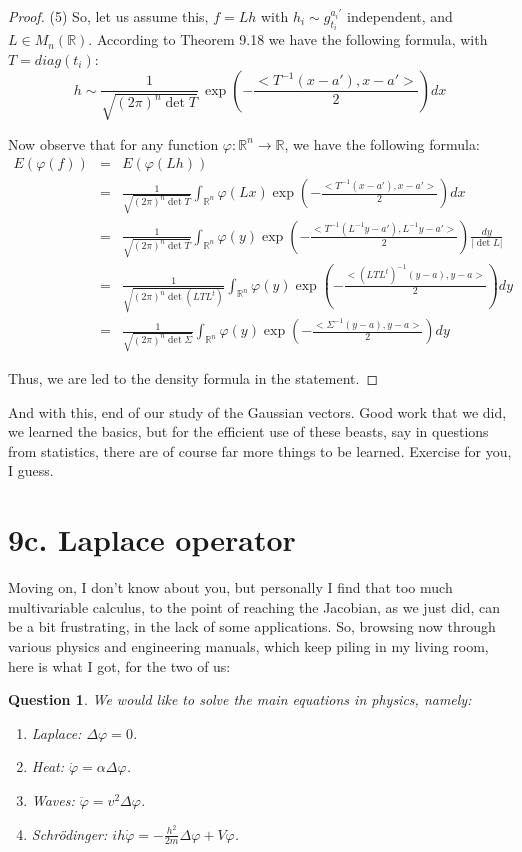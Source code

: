 \documentclass[12pt]{amsbook}
\newtheorem{question}[theorem]{Question}
\begin{document}
\begin{proof}
\medskip

(5) So, let us assume this, $f=Lh$ with $h_i\sim g_{t_i}^{a_i'}$ independent, and $L\in M_n(\mathbb R)$. According to Theorem 9.18 we have the following formula, with $T=diag(t_i)$:
$$h\sim\frac{1}{\sqrt{(2\pi)^n\det T}}\,\exp\left(-\frac{<T^{-1}(x-a'),x-a'>}{2}\right)dx$$

Now observe that for any function $\varphi:\mathbb R^n\to\mathbb R$, we have the following formula:
\begin{eqnarray*}
E(\varphi(f))
&=&E(\varphi(Lh))\\
&=&\frac{1}{\sqrt{(2\pi)^n\det T}}\int_{\mathbb R^n}\varphi(Lx)\exp\left(-\frac{<T^{-1}(x-a'),x-a'>}{2}\right)dx\\
&=&\frac{1}{\sqrt{(2\pi)^n\det T}}\int_{\mathbb R^n}\varphi(y)\exp\left(-\frac{<T^{-1}(L^{-1}y-a'),L^{-1}y-a'>}{2}\right)\frac{dy}{|\det L|}\\
&=&\frac{1}{\sqrt{(2\pi)^n\det(LTL^t)}}\int_{\mathbb R^n}\varphi(y)\exp\left(-\frac{<(LTL^t)^{-1}(y-a),y-a>}{2}\right)dy\\
&=&\frac{1}{\sqrt{(2\pi)^n\det\Sigma}}\int_{\mathbb R^n}\varphi(y)\exp\left(-\frac{<\Sigma^{-1}(y-a),y-a>}{2}\right)dy
\end{eqnarray*}

Thus, we are led to the density formula in the statement.
\end{proof}

And with this, end of our study of the Gaussian vectors. Good work that we did, we learned the basics, but for the efficient use of these beasts, say in questions from statistics, there are of course far more things to be learned. Exercise for you, I guess.

\section*{9c. Laplace operator}

Moving on, I don't know about you, but personally I find that too much multivariable calculus, to the point of reaching the Jacobian, as we just did, can be a bit frustrating, in the lack of some applications. So, browsing now through various physics and engineering manuals, which keep piling in my living room, here is what I got, for the two of us:

\begin{question}
We would like to solve the main equations in physics, namely:
\begin{enumerate}
\item Laplace: $\Delta\varphi=0$.

\item Heat: $\dot{\varphi}=\alpha\Delta\varphi$.

\item Waves: $\ddot{\varphi}=v^2\Delta\varphi$.

\item Schr\"odinger: $ih\dot{\varphi}=-\frac{h^2}{2m}\Delta\varphi+V\varphi$.
\end{enumerate}
\end{question}
\end{document}
